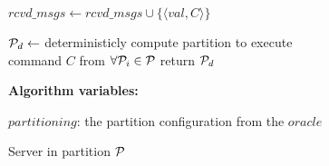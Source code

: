 \begin{algorithm}[h!]
\begin{distribalgo}[1]
\vspace{1.0mm}
    \STATE $rcvd\_msgs \leftarrow rcvd\_msgs \cup \{\langle val, C \rangle\}$
\ENDINDENT

	\STATE $\mathcal{P}_d \leftarrow$ deterministicly compute partition to execute\\ \hspace{8mm} command $C$ from $\forall \mathcal{P}_i \in \mathcal{P}$
	\STATE return $\mathcal{P}_d$
\ENDINDENT	

\vspace{1.5mm}

\textbf{Algorithm variables:}

\vspace{1mm}

$partitioning$: the partition configuration from the $oracle$



\caption{Server in partition $\mathcal{P}$}
\label{alg:server_proxy}
\end{distribalgo}
\end{algorithm}